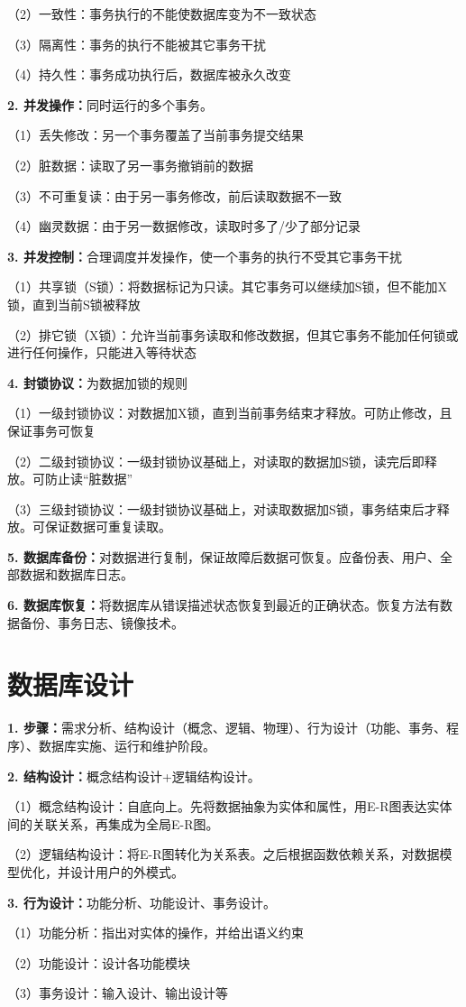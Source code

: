 \quad（2）一致性：事务执行的不能使数据库变为不一致状态

\quad（3）隔离性：事务的执行不能被其它事务干扰

\quad（4）持久性：事务成功执行后，数据库被永久改变

\textbf{2. 并发操作：}同时运行的多个事务。

\quad（1）丢失修改：另一个事务覆盖了当前事务提交结果

\quad（2）脏数据：读取了另一事务撤销前的数据

\quad（3）不可重复读：由于另一事务修改，前后读取数据不一致

\quad（4）幽灵数据：由于另一数据修改，读取时多了/少了部分记录

\textbf{3. 并发控制：}合理调度并发操作，使一个事务的执行不受其它事务干扰

\quad（1）共享锁（S锁）：将数据标记为只读。其它事务可以继续加S锁，但不能加X锁，直到当前S锁被释放

\quad（2）排它锁（X锁）：允许当前事务读取和修改数据，但其它事务不能加任何锁或进行任何操作，只能进入等待状态

\textbf{4. 封锁协议：}为数据加锁的规则

\quad（1）一级封锁协议：对数据加X锁，直到当前事务结束才释放。可防止修改，且保证事务可恢复

\quad（2）二级封锁协议：一级封锁协议基础上，对读取的数据加S锁，读完后即释放。可防止读“脏数据”

\quad（3）三级封锁协议：一级封锁协议基础上，对读取数据加S锁，事务结束后才释放。可保证数据可重复读取。

\textbf{5. 数据库备份：}对数据进行复制，保证故障后数据可恢复。应备份表、用户、全部数据和数据库日志。

\textbf{6. 数据库恢复：}将数据库从错误描述状态恢复到最近的正确状态。恢复方法有数据备份、事务日志、镜像技术。

\section{数据库设计}

\textbf{1. 步骤：}需求分析、结构设计（概念、逻辑、物理）、行为设计（功能、事务、程序）、数据库实施、运行和维护阶段。

\textbf{2. 结构设计：}概念结构设计+逻辑结构设计。

\quad（1）概念结构设计：自底向上。先将数据抽象为实体和属性，用E-R图表达实体间的关联关系，再集成为全局E-R图。

\quad（2）逻辑结构设计：将E-R图转化为关系表。之后根据函数依赖关系，对数据模型优化，并设计用户的外模式。

\textbf{3. 行为设计：}功能分析、功能设计、事务设计。

\quad（1）功能分析：指出对实体的操作，并给出语义约束

\quad（2）功能设计：设计各功能模块

\quad（3）事务设计：输入设计、输出设计等